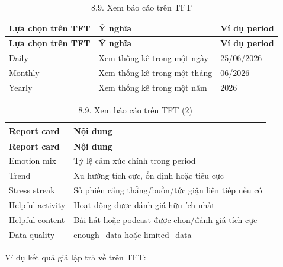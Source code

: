 \documentclass[12pt,a4paper]{article}
\begin{document}
\begin{center}
\begin{longtable}{|P{0.25\textwidth}|P{0.32\textwidth}|P{0.33\textwidth}|}
\caption{8.9. Xem báo cáo trên TFT}\\
\hline
\textbf{Lựa chọn trên TFT} & \textbf{Ý nghĩa} & \textbf{Ví dụ period} \\
\hline
\endfirsthead
\hline
\textbf{Lựa chọn trên TFT} & \textbf{Ý nghĩa} & \textbf{Ví dụ period} \\
\hline
\endhead
Daily & Xem thống kê trong một ngày & 25/06/2026 \\
\hline
Monthly & Xem thống kê trong một tháng & 06/2026 \\
\hline
Yearly & Xem thống kê trong một năm & 2026 \\
\hline
\end{longtable}
\end{center}

\begin{center}
\begin{longtable}{|P{0.30\textwidth}|P{0.62\textwidth}|}
\caption{8.9. Xem báo cáo trên TFT (2)}\\
\hline
\textbf{Report card} & \textbf{Nội dung} \\
\hline
\endfirsthead
\hline
\textbf{Report card} & \textbf{Nội dung} \\
\hline
\endhead
Emotion mix & Tỷ lệ cảm xúc chính trong period \\
\hline
Trend & Xu hướng tích cực, ổn định hoặc tiêu cực \\
\hline
Stress streak & Số phiên căng thẳng/buồn/tức giận liên tiếp nếu có \\
\hline
Helpful activity & Hoạt động được đánh giá hữu ích nhất \\
\hline
Helpful content & Bài hát hoặc podcast được chọn/đánh giá tích cực \\
\hline
Data quality & enough\_data hoặc limited\_data \\
\hline
\end{longtable}
\end{center}

Ví dụ kết quả giả lập trả về trên TFT:
\end{document}
